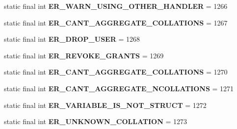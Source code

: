 \begin{DoxyCompactItemize}
static final int {\bfseries E\+R\+\_\+\+W\+A\+R\+N\+\_\+\+U\+S\+I\+N\+G\+\_\+\+O\+T\+H\+E\+R\+\_\+\+H\+A\+N\+D\+L\+ER} = 1266
\item 
\mbox{\label{classcom_1_1mysql_1_1jdbc_1_1_mysql_error_numbers_a0bb75d5b98f2a866d24e2e1e1339bc2e}} 
static final int {\bfseries E\+R\+\_\+\+C\+A\+N\+T\+\_\+\+A\+G\+G\+R\+E\+G\+A\+T\+E\+\_\+C\+O\+L\+L\+A\+T\+I\+O\+NS} = 1267
\item 
\mbox{\label{classcom_1_1mysql_1_1jdbc_1_1_mysql_error_numbers_aee53beaff23323cef008b22f0274b16d}} 
static final int {\bfseries E\+R\+\_\+\+D\+R\+O\+P\+\_\+\+U\+S\+ER} = 1268
\item 
\mbox{\label{classcom_1_1mysql_1_1jdbc_1_1_mysql_error_numbers_a732f836833e5d8ceb79b069961305acc}} 
static final int {\bfseries E\+R\+\_\+\+R\+E\+V\+O\+K\+E\+\_\+\+G\+R\+A\+N\+TS} = 1269
\item 
\mbox{\label{classcom_1_1mysql_1_1jdbc_1_1_mysql_error_numbers_ac8b457f4fd9eff31ed5168f05ab37548}} 
static final int {\bfseries E\+R\+\_\+\+C\+A\+N\+T\+\_\+\+A\+G\+G\+R\+E\+G\+A\+T\+E\+\_\+C\+O\+L\+L\+A\+T\+I\+O\+NS} = 1270
\item 
\mbox{\label{classcom_1_1mysql_1_1jdbc_1_1_mysql_error_numbers_afbf3ea9a7e7a954e41df55143cbdfe4d}} 
static final int {\bfseries E\+R\+\_\+\+C\+A\+N\+T\+\_\+\+A\+G\+G\+R\+E\+G\+A\+T\+E\+\_\+\+N\+C\+O\+L\+L\+A\+T\+I\+O\+NS} = 1271
\item 
\mbox{\label{classcom_1_1mysql_1_1jdbc_1_1_mysql_error_numbers_ad54db6e4c772c71759fc7080782c1dc1}} 
static final int {\bfseries E\+R\+\_\+\+V\+A\+R\+I\+A\+B\+L\+E\+\_\+\+I\+S\+\_\+\+N\+O\+T\+\_\+\+S\+T\+R\+U\+CT} = 1272
\item 
\mbox{\label{classcom_1_1mysql_1_1jdbc_1_1_mysql_error_numbers_a71f7b3baed2d13f4930ae30276926104}} 
static final int {\bfseries E\+R\+\_\+\+U\+N\+K\+N\+O\+W\+N\+\_\+\+C\+O\+L\+L\+A\+T\+I\+ON} = 1273
\item 

\end{DoxyCompactItemize}
